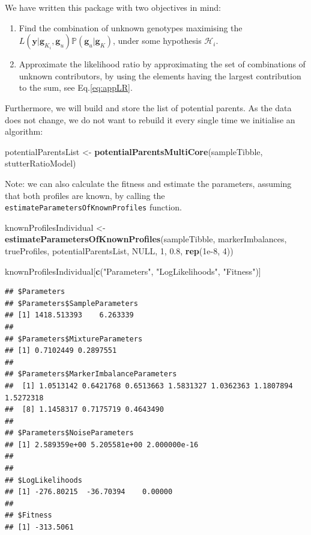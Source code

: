 \documentclass[]{article}
\newenvironment{Shaded}{\begin{snugshade}}{\end{snugshade}}
\newcommand{\KeywordTok}[1]{\textcolor[rgb]{0.13,0.29,0.53}{\textbf{#1}}}
\newcommand{\DecValTok}[1]{\textcolor[rgb]{0.00,0.00,0.81}{#1}}
\newcommand{\FloatTok}[1]{\textcolor[rgb]{0.00,0.00,0.81}{#1}}
\newcommand{\StringTok}[1]{\textcolor[rgb]{0.31,0.60,0.02}{#1}}
\newcommand{\OtherTok}[1]{\textcolor[rgb]{0.56,0.35,0.01}{#1}}
\newcommand{\NormalTok}[1]{#1}
\newcommand{\bs}[1]{\ensuremath{\boldsymbol{#1}}}
\newcommand{\mc}[1]{\ensuremath{\mathcal{#1}}}
\newcommand{\mcg}{\ensuremath{g}}
\newcommand{\p}[1]{\ensuremath{\mathbb{P}\left(#1\right)}}
\begin{document}
We have written this package with two objectives in mind:

\begin{enumerate}[(1)]
\item Find the combination of unknown genotypes maximising the $L\left(\bs{y}|\bs \mcg_{K_i}, \bs \mcg_{u}\right)\p{\bs \mcg_{u}|\bs \mcg_{K}}$, under some hypothesis $\mc H_i$.
\item Approximate the likelihood ratio by approximating the set of combinations of unknown contributors, by using the elements having the largest contribution to the sum, see Eq.\eqref{eq:appLR}.
\end{enumerate}

Furthermore, we will build and store the list of potential parents. As
the data does not change, we do not want to rebuild it every single time
we initialise an algorithm:

\begin{Shaded}
\begin{Highlighting}[]
\NormalTok{potentialParentsList <-}\StringTok{ }\KeywordTok{potentialParentsMultiCore}\NormalTok{(sampleTibble, stutterRatioModel)}
\end{Highlighting}
\end{Shaded}

Note: we can also calculate the fitness and estimate the parameters,
assuming that both profiles are known, by calling the
\texttt{estimateParametersOfKnownProfiles} function.

\begin{Shaded}
\begin{Highlighting}[]
\NormalTok{knownProfilesIndividual <-}\StringTok{ }
\StringTok{    }\KeywordTok{estimateParametersOfKnownProfiles}\NormalTok{(sampleTibble, markerImbalances, trueProfiles, }
\NormalTok{                                      potentialParentsList, }
                                      \OtherTok{NULL}\NormalTok{, }\DecValTok{1}\NormalTok{, }\FloatTok{0.8}\NormalTok{, }\KeywordTok{rep}\NormalTok{(}\FloatTok{1e-8}\NormalTok{, }\DecValTok{4}\NormalTok{))}

\NormalTok{knownProfilesIndividual[}\KeywordTok{c}\NormalTok{(}\StringTok{"Parameters"}\NormalTok{, }\StringTok{"LogLikelihoods"}\NormalTok{, }\StringTok{"Fitness"}\NormalTok{)]}
\end{Highlighting}
\end{Shaded}

\begin{verbatim}
## $Parameters
## $Parameters$SampleParameters
## [1] 1418.513393    6.263339
## 
## $Parameters$MixtureParameters
## [1] 0.7102449 0.2897551
## 
## $Parameters$MarkerImbalanceParameters
##  [1] 1.0513142 0.6421768 0.6513663 1.5831327 1.0362363 1.1807894 1.5272318
##  [8] 1.1458317 0.7175719 0.4643490
## 
## $Parameters$NoiseParameters
## [1] 2.589359e+00 5.205581e+00 2.000000e-16
## 
## 
## $LogLikelihoods
## [1] -276.80215  -36.70394    0.00000
## 
## $Fitness
## [1] -313.5061
\end{verbatim}
\end{document}
